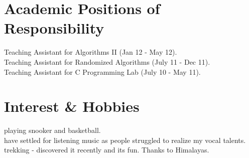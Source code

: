 \documentclass[margin,line]{resume}
\begin{document}
\begin{resume}
   

    \section{\mysidestyle Academic Positions of Responsibility} 
	Teaching Assistant for Algorithms II (Jan 12 - May 12).\\ 
	Teaching Assistant for Randomized Algorithms (July 11 - Dec 11).\\ 
	Teaching Assistant for C Programming Lab (July 10 - May 11).\\
    \section{\mysidestyle Interest \& Hobbies}
    playing snooker and basketball.\\
    have settled for listening music as people struggled to realize my vocal talents.\\
    trekking - discovered it recently and its fun. Thanks to Himalayas.\\ 

\end{resume}
\end{document}
